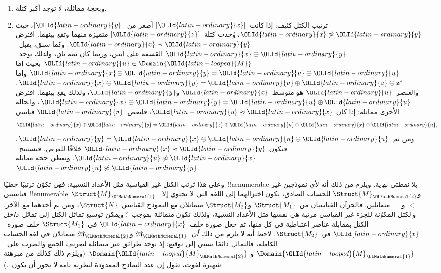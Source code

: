 \documentclass[../../../include/open-logic-section]{subfiles}
\begin{document}
\begin{enumerate}
  ${\OLId{latin-ordinary}{y}} = {\OLId{latin-ordinary}{x}} \oplus {\OLId{latin-ordinary}{x}} \oplus \mathbf{z}^*$ على هذا القياس.
\item وبحجة مماثلة، لا توجد أكبر كتلة.
\item ترتيب الكتل كثيف: إذا كانت~$[{\OLId{latin-ordinary}{x}}]$ أصغر من~$[{\OLId{latin-ordinary}{y}}]$، حيث
  ${\OLId{latin-ordinary}{x}} \not\approx {\OLId{latin-ordinary}{y}}$، وُجدت كتلة~$[{\OLId{latin-ordinary}{z}}]$ متميزة منهما وتقع بينهما. افترض
  ${\OLId{latin-ordinary}{x}} \prec {\OLId{latin-ordinary}{y}}$. وكما سبق، يقبل~${\OLId{latin-ordinary}{x}} \oplus {\OLId{latin-ordinary}{y}}$ القسمة على اثنين، وربما
  كان ثمة باق، ولذلك يوجد~${\OLId{latin-ordinary}{u}} \in \Domain{{\OLId{latin-looped}{M}}}$ بحيث إما
  ${\OLId{latin-ordinary}{x}} \oplus {\OLId{latin-ordinary}{y}} = {\OLId{latin-ordinary}{u}} \oplus {\OLId{latin-ordinary}{u}}$ وإما
  ${\OLId{latin-ordinary}{x}} \oplus {\OLId{latin-ordinary}{y}} = {\OLId{latin-ordinary}{u}} \oplus {\OLId{latin-ordinary}{u}} \oplus \mathbf{z}^*$. والعنصر~${\OLId{latin-ordinary}{u}}$ هو
  متوسط~${\OLId{latin-ordinary}{x}}$ و${\OLId{latin-ordinary}{y}}$، ولذلك يقع بينهما. افترض
  ${\OLId{latin-ordinary}{x}} \oplus {\OLId{latin-ordinary}{y}} = {\OLId{latin-ordinary}{u}} \oplus {\OLId{latin-ordinary}{u}}$، والحالة الأخرى مماثلة: إذا كان
  ${\OLId{latin-ordinary}{u}} \approx {\OLId{latin-ordinary}{x}}$، فلبعض~${\OLId{latin-ordinary}{n}}$ قياسي
  \[
  {\OLId{latin-ordinary}{x}} \oplus {\OLId{latin-ordinary}{y}} = {\OLId{latin-ordinary}{x}} \oplus {\OLId{latin-ordinary}{n}} \oplus {\OLId{latin-ordinary}{x}} \oplus {\OLId{latin-ordinary}{n}},
  \]
  ومن ثم~${\OLId{latin-ordinary}{y}} = {\OLId{latin-ordinary}{x}} \oplus {\OLId{latin-ordinary}{n}} \oplus {\OLId{latin-ordinary}{n}}$، فيكون~${\OLId{latin-ordinary}{x}} \approx {\OLId{latin-ordinary}{y}}$ خلافًا
  للفرض. فنستنتج~${\OLId{latin-ordinary}{u}} \not\approx {\OLId{latin-ordinary}{x}}$. وتعطي حجة مماثلة
  ${\OLId{latin-ordinary}{u}} \not\approx {\OLId{latin-ordinary}{y}}$.
\end{enumerate}
وعلى هذا تُرتب الكتل غير القياسية مثل الأعداد النسبية: فهي تكوّن ترتيبًا
خطيًا~!!a{enumerable} بلا نقطتي نهاية. ويلزم من ذلك أنه لأي نموذجين
غير قياسيين~!!{enumerable}~$\Struct{M}_{\OLMathNumeral{1}}$ و$\Struct{M}_{\OLMathNumeral{2}}$ للحساب
الصادق، يكون اختزالهما إلى اللغة التي لا تحتوي إلا~$<$ و$=$ متماثلين.
فالجزآن القياسيان من~$\Struct{M_1}$ و$\Struct{M_2}$ متماثلان مع
النموذج القياسي~$\Struct{N}$، ومن ثم أحدهما مع الآخر. والكتل المكوّنة
للجزء غير القياسي مرتبة هي نفسها مثل الأعداد النسبية، ولذلك تكون
متماثلة بموجب~؛ ويمكن توسيع تماثل الكتل إلى
تماثل~\emph{داخل} الكتل بمقابلة عناصر اعتباطية في كل منها، ثم جعل
صورة خلف~${\OLId{latin-ordinary}{x}}$ في~$\Struct{M_1}$ خلف صورة~${\OLId{latin-ordinary}{x}}$ في~$\Struct{M_2}$. لاحظ
أنه لا يلزم من ذلك~\emph{أن}~$\mathfrak{M}_{\OLMathNumeral{1}}$ و$\mathfrak{M}_{\OLMathNumeral{2}}$
متماثلان في لغة الحساب الكاملة، فالتماثل دائمًا نسبي إلى توقيع؛ إذ
توجد طرائق غير متماثلة لتعريف الجمع والضرب على~$\Domain{{\OLId{latin-looped}{M}}_{\OLMathNumeral{1}}}$ و
$\Domain{{\OLId{latin-looped}{M}}_{\OLMathNumeral{2}}}$. (ويلزم ذلك كذلك من مبرهنة شهيرة لفوت، تقول إن عدد
النماذج المعدودة لنظرية تامة لا يجوز أن يكون~.)
\end{document}
